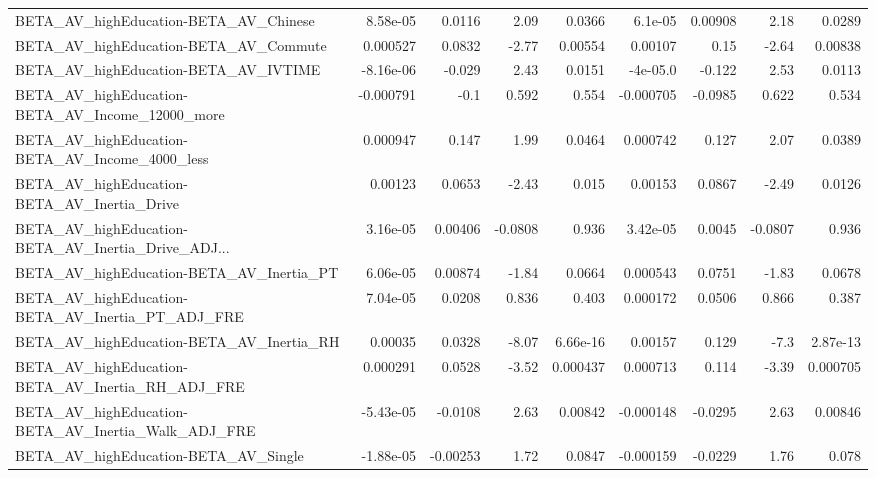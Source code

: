 \begin{tabular}{lrrrrrrrr}
BETA\_AV\_highEducation-BETA\_AV\_Chinese              &    8.58e-05 &       0.0116 &     2.09 &   0.0366 &    6.1e-05 &     0.00908 &         2.18 &        0.0289 \\
BETA\_AV\_highEducation-BETA\_AV\_Commute              &    0.000527 &       0.0832 &    -2.77 &  0.00554 &    0.00107 &        0.15 &        -2.64 &       0.00838 \\
BETA\_AV\_highEducation-BETA\_AV\_IVTIME               &   -8.16e-06 &       -0.029 &     2.43 &   0.0151 &   -4e-05.0 &      -0.122 &         2.53 &        0.0113 \\
BETA\_AV\_highEducation-BETA\_AV\_Income\_12000\_more    &   -0.000791 &         -0.1 &    0.592 &    0.554 &  -0.000705 &     -0.0985 &        0.622 &         0.534 \\
BETA\_AV\_highEducation-BETA\_AV\_Income\_4000\_less     &    0.000947 &        0.147 &     1.99 &   0.0464 &   0.000742 &       0.127 &         2.07 &        0.0389 \\
BETA\_AV\_highEducation-BETA\_AV\_Inertia\_Drive        &     0.00123 &       0.0653 &    -2.43 &    0.015 &    0.00153 &      0.0867 &        -2.49 &        0.0126 \\
BETA\_AV\_highEducation-BETA\_AV\_Inertia\_Drive\_ADJ... &    3.16e-05 &      0.00406 &  -0.0808 &    0.936 &   3.42e-05 &      0.0045 &      -0.0807 &         0.936 \\
BETA\_AV\_highEducation-BETA\_AV\_Inertia\_PT           &    6.06e-05 &      0.00874 &    -1.84 &   0.0664 &   0.000543 &      0.0751 &        -1.83 &        0.0678 \\
BETA\_AV\_highEducation-BETA\_AV\_Inertia\_PT\_ADJ\_FRE   &    7.04e-05 &       0.0208 &    0.836 &    0.403 &   0.000172 &      0.0506 &        0.866 &         0.387 \\
BETA\_AV\_highEducation-BETA\_AV\_Inertia\_RH           &     0.00035 &       0.0328 &    -8.07 & 6.66e-16 &    0.00157 &       0.129 &         -7.3 &      2.87e-13 \\
BETA\_AV\_highEducation-BETA\_AV\_Inertia\_RH\_ADJ\_FRE   &    0.000291 &       0.0528 &    -3.52 & 0.000437 &   0.000713 &       0.114 &        -3.39 &      0.000705 \\
BETA\_AV\_highEducation-BETA\_AV\_Inertia\_Walk\_ADJ\_FRE &   -5.43e-05 &      -0.0108 &     2.63 &  0.00842 &  -0.000148 &     -0.0295 &         2.63 &       0.00846 \\
BETA\_AV\_highEducation-BETA\_AV\_Single               &   -1.88e-05 &     -0.00253 &     1.72 &   0.0847 &  -0.000159 &     -0.0229 &         1.76 &         0.078 \\

\end{tabular}
